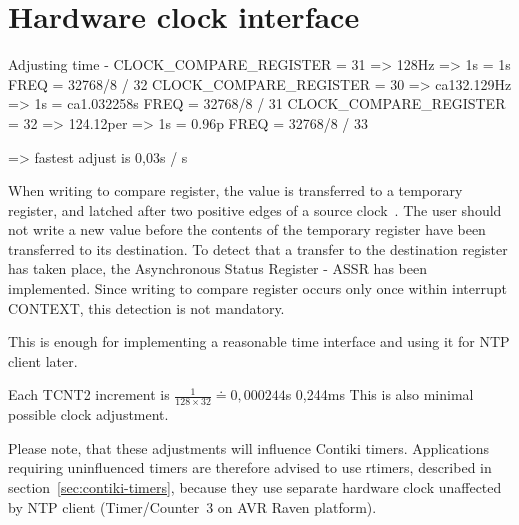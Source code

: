 
\section{Hardware clock interface}

Adjusting time - CLOCK\_COMPARE\_REGISTER = 31 => 128Hz => 1s = 1s
FREQ = 32768/8 / 32
CLOCK\_COMPARE\_REGISTER = 30 => ca132.129Hz => 1s = ca1.032258s
FREQ = 32768/8 / 31
CLOCK\_COMPARE\_REGISTER = 32 => 124.12per => 1s = 0.96p
FREQ = 32768/8 / 33

=> fastest adjust is 0,03s / s

When writing to compare register, the value is transferred to a
temporary register, and latched after two positive edges of a source clock~\cite{avr-datasheet}.
The user should not write a new value before the contents
of the temporary register have been transferred to its destination.
To detect that a transfer to the destination register has taken place,
the Asynchronous Status Register - ASSR has been implemented.
Since writing to compare register occurs only once within interrupt CONTEXT, %
this detection is not mandatory.



This is enough for implementing a reasonable time interface and using it for NTP client later.



Each TCNT2 increment is $\frac{1}{128 \times 32} \doteq 0,000244$s
0,244ms
This is also minimal possible clock adjustment.


Please note, that these adjustments will influence Contiki timers.
Applications requiring uninfluenced timers
are therefore advised to use rtimers, described in section~\ref{sec:contiki-timers},
because they use separate hardware clock unaffected by NTP client
(Timer/Counter~3 on AVR Raven platform).
